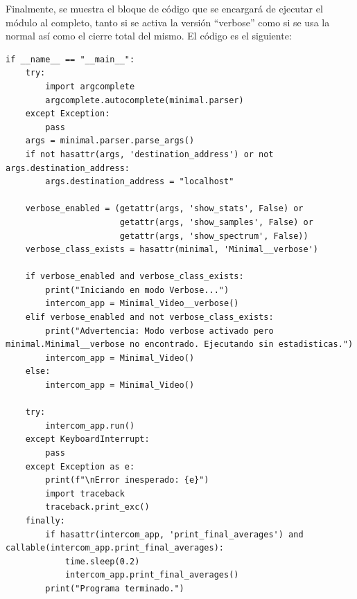 Finalmente, se muestra el bloque de código que se encargará de ejecutar el módulo al completo, tanto si se activa la versión ``verbose'' como si se usa la normal así como el cierre total del mismo. El código es el siguiente:
\begin{lstlisting}[style=pythonstyle, caption={Bloque de ejecución del \texttt{main()} de \textit{Minimal\_Video}.}, label={lst:main_minimal_video}]
if __name__ == "__main__":
    try:
        import argcomplete
        argcomplete.autocomplete(minimal.parser)
    except Exception:
        pass
    args = minimal.parser.parse_args()
    if not hasattr(args, 'destination_address') or not args.destination_address:
        args.destination_address = "localhost"

    verbose_enabled = (getattr(args, 'show_stats', False) or
                       getattr(args, 'show_samples', False) or
                       getattr(args, 'show_spectrum', False))
    verbose_class_exists = hasattr(minimal, 'Minimal__verbose')

    if verbose_enabled and verbose_class_exists:
        print("Iniciando en modo Verbose...")
        intercom_app = Minimal_Video__verbose()
    elif verbose_enabled and not verbose_class_exists:
        print("Advertencia: Modo verbose activado pero minimal.Minimal__verbose no encontrado. Ejecutando sin estadisticas.")
        intercom_app = Minimal_Video()
    else:
        intercom_app = Minimal_Video()

    try:
        intercom_app.run()
    except KeyboardInterrupt:
        pass
    except Exception as e:
        print(f"\nError inesperado: {e}")
        import traceback
        traceback.print_exc()
    finally:
        if hasattr(intercom_app, 'print_final_averages') and callable(intercom_app.print_final_averages):
            time.sleep(0.2)
            intercom_app.print_final_averages()
        print("Programa terminado.")
\end{lstlisting}
\vspace{\baselineskip}

